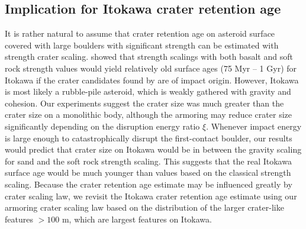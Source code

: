 \documentclass[3p,authoryear]{elsarticle}
\begin{document}
 \subsection{Implication for Itokawa crater retention age}\label{sec:itokawa-age}
It is rather natural to assume that crater retention age on asteroid surface covered with large boulders with significant strength can be estimated with strength crater scaling. \citet{michel2009} showed that strength scalings with both basalt and soft rock strength values would yield relatively old surface ages (75 Myr -- 1 Gyr) for Itokawa if the crater candidates found by \citet{hirata2009} are of impact origin.
 However, Itokawa is most likely a rubble-pile asteroid, which is weakly gathered with gravity and cohesion.
 Our experiments suggest the crater size was much greater than the crater size on a monolithic body, although the armoring may reduce crater size significantly depending on the disruption energy ratio $\xi$.
 Whenever impact energy is large enough to catastrophically disrupt the first-contact boulder, our results would predict that crater size on Itokawa would be in between the gravity scaling for sand and the soft rock strength scaling. This suggests that the real Itokawa surface age would be much younger than values based on the classical strength scaling.
Because the crater retention age estimate may be influenced greatly by crater scaling law, we revisit the Itokawa crater retention age estimate using our armoring crater scaling law based on the distribution of the larger crater-like features $>100$ m, which are largest features on Itokawa.
\end{document}
